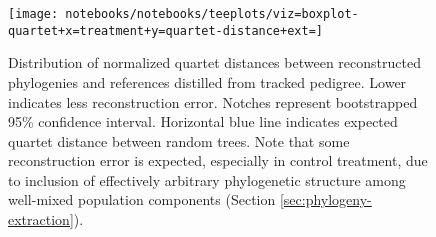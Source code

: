 \begin{figure}
  \centering
  \texttt{[image: notebooks/notebooks/teeplots/viz=boxplot-quartet+x=treatment+y=quartet-distance+ext=]}
  \caption{
    Distribution of normalized quartet distances between reconstructed phylogenies and references distilled from tracked pedigree.
    Lower indicates less reconstruction error.
    Notches represent bootstrapped 95\% confidence interval.
    Horizontal blue line indicates expected quartet distance between random trees.
    Note that some reconstruction error is expected, especially in control treatment, due to inclusion of effectively arbitrary phylogenetic structure among well-mixed population components (Section \ref{sec:phylogeny-extraction}).
  }
  \label{fig:species-reconstruction-error}
\end{figure}
